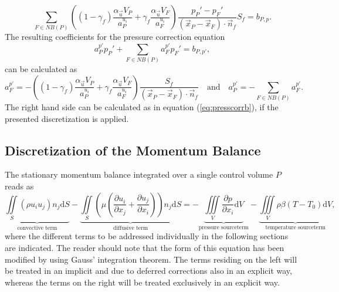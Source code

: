 \begin{equation}
  \sum_{F \in NB(P)} \left(\left(1 - \gamma_f\right) \frac{\alpha_\vec{u} V_P}{a_P^{u_i}} + \gamma_f \frac{\alpha_\vec{u} V_F}{a_F^{u_i}}\right)
   \frac{p_P' - p_F'}{\left(\vec{x}_P - \vec{x}_F\right)\cdot \vec{n}_f} S_f
  = b_{P,p}.
\end{equation}
The resulting coefficients for the pressure correction equation
\begin{displaymath}
  a_P^{p'} p_{P}' + \sum_{F \in NB(P)} a_F^{p'} p_{F}' = b_{P,p'},
\end{displaymath}
can be calculated as
\begin{equation}
  \label{eq:segpresscorrcoeff}
  a_F^{p'} = -\left(\left(1 - \gamma_f\right) \frac{\alpha_\vec{u} V_P}{a_P^{u_i}} + \gamma_f \frac{\alpha_\vec{u} V_F}{a_F^{u_i}}\right) \frac{S_f}{\left(\vec{x}_P - \vec{x}_F\right) \cdot \vec{n}_f} \quad \text{and} \quad
  a_P^{p'} = - \sum_{F \in NB(P)} a_F^{p'}.
\end{equation}
The right hand side can be calculated as in equation (\ref{eq:presscorrb}), if the presented discretization is applied. 

\subsection{Discretization of the Momentum Balance}
\label{sec:segdiscretization}

The stationary momentum balance integrated over a single control volume \(P\) reads as
\begin{equation}
  \label{eq:semidiscrete}
  \underbrace{\iint\limits_S (\rho u_i u_j)n_j \mathrm{d}S}_{\text{convective term}}
  - \underbrace{\iint\limits_S \left(\mu \left( \frac{\partial u_i}{\partial x_j} + \frac{\partial u_j}{\partial x_i}\right)\right)n_j \mathrm{d}S}_{\text{diffusive term}}
  = - \underbrace{\iiint\limits_V \frac{\partial p}{\partial x_i} \mathrm{d}V}_{\text{pressure sourceterm}}
  - \underbrace{\iiint\limits_V \rho \beta \left(T - T_0\right) \mathrm{d}V}_{\text{temperature sourceterm}},
\end{equation}
where the different terms to be addressed individually in the following sections are indicated. The reader should note that the form of this equation has been modified by using Gauss' integration theorem. The terms residing on the left will be treated in an implicit and due to deferred corrections also in an explicit way, whereas the terms on the right will be treated exclusively in an  explicit way.


